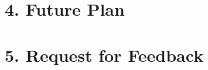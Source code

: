 \documentclass[11pt, a4paper, twoside, openright]{report}
\begin{document}



\section*{4. Future Plan}


\section*{5. Request for Feedback}



\backmatter{}

%


\end{document}
